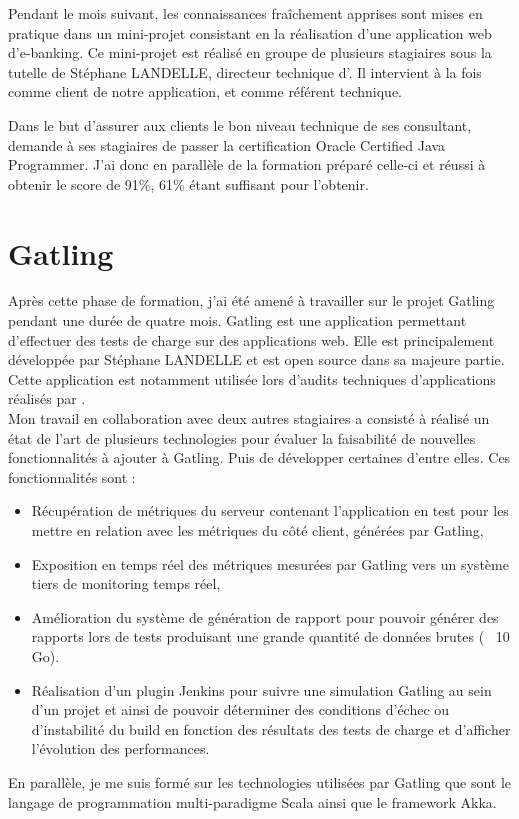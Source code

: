 Pendant le mois suivant, les connaissances fraîchement apprises sont mises en pratique dans un mini-projet consistant en la réalisation d'une application web d'e-banking. Ce mini-projet est réalisé en groupe de plusieurs stagiaires sous la tutelle de Stéphane LANDELLE, directeur technique d'\ebi{}. Il intervient à la fois comme client de notre application, et comme référent technique.

Dans le but d'assurer aux clients le bon niveau technique de ses consultant, \ebi{} demande à ses stagiaires de passer la certification Oracle Certified Java Programmer. J'ai donc en parallèle de la formation préparé celle-ci et réussi à obtenir le score de 91\%, 61\% étant suffisant pour l'obtenir. 

\section{Gatling}

Après cette phase de formation, j'ai été amené à travailler sur le projet Gatling pendant une durée de quatre mois. Gatling est une application permettant d'effectuer des tests de charge sur des applications web. Elle est principalement développée par Stéphane LANDELLE et est open source dans sa majeure partie. Cette application est notamment utilisée lors d'audits techniques d'applications réalisés par \ebi{}.\\

Mon travail en collaboration avec deux autres stagiaires a consisté à réalisé un état de l'art de plusieurs technologies pour évaluer la faisabilité de nouvelles fonctionnalités à ajouter à Gatling. Puis de développer certaines d'entre elles. Ces fonctionnalités sont :

\begin{itemize}
	\item Récupération de métriques du serveur contenant l'application en test pour les mettre en relation avec les métriques du côté client, générées par Gatling,
	\item Exposition en temps réel des métriques mesurées par Gatling vers un système tiers de monitoring temps réel,
	\item Amélioration du système de génération de rapport pour pouvoir générer des rapports lors de tests produisant une grande quantité de données brutes (~ 10 Go).
	\item Réalisation d'un plugin Jenkins pour suivre une simulation Gatling au sein d'un projet et ainsi de pouvoir déterminer des conditions d'échec ou d'instabilité du build en fonction des résultats des tests de charge et d'afficher l'évolution des performances.\\
\end{itemize}

En parallèle, je me suis formé sur les technologies utilisées par Gatling que sont le langage de programmation multi-paradigme Scala ainsi que le framework Akka.